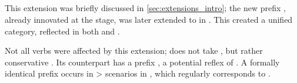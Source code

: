 \subsection{\PWai {}}
\label{sec:waiwaian}
This extension was briefly discussed in \cref{sec:extensions_intro}; the new  prefix , already innovated at the \PPar stage, was later extended to  in \PWai.
This created a unified  category, reflected in both \hixka and \waiwai {}.
%

%
%
Not all verbs were affected by this extension; \waiwai {}  does not take , but rather conservative  .
Its \hixka counterpart has a prefix  , a potential reflex of  .
A formally identical prefix occurs in > scenarios in \hixka {}, which regularly corresponds to \waiwai {} .

